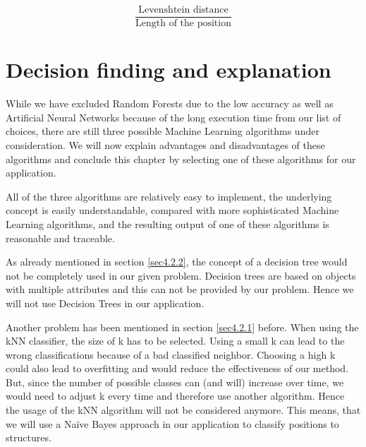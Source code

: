\[
\frac {\text{Levenshtein distance}}{\text{Length of the position}}
\]

\section{Decision finding and explanation}
\label{sec4.3}

While we have excluded Random Forests due to the low accuracy as well as Artificial Neural Networks because of the long execution time from our list of choices, there are still three possible Machine Learning algorithms under consideration. We will now explain advantages and disadvantages of these algorithms and conclude this chapter by selecting one of these algorithms for our application.

All of the three algorithms are relatively easy to implement, the underlying concept is easily understandable, compared with more sophisticated Machine Learning algorithms, and the resulting output of one of these algorithms is reasonable and traceable. 

As already mentioned in section \ref{sec4.2.2}, the concept of a decision tree would not be completely used in our given problem. Decision trees are based on objects with multiple attributes and this can not be provided by our problem. Hence we will not use Decision Trees in our application.

Another problem has been mentioned in section \ref{sec4.2.1} before. When using the kNN classifier, the size of k has to be selected. Using a small k can lead to the wrong classifications because of a bad classified neighbor. Choosing a high k could also lead to overfitting and would reduce the effectiveness of our method. But, since the number of possible classes can (and will) increase over time, we would need to adjust k every time and therefore use another algorithm. Hence the usage of the kNN algorithm will not be considered anymore.
This means, that we will use a Na{\"i}ve Bayes approach in our application to classify positions to structures. 